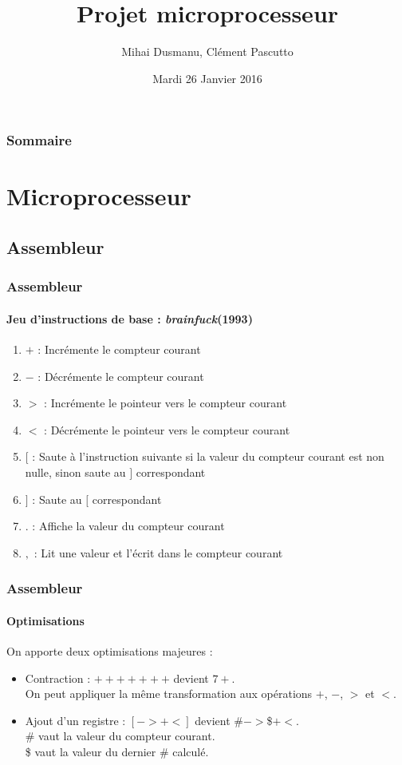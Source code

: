 \documentclass{beamer}
\title{Projet microprocesseur}
\author{Mihai Dusmanu, Clément Pascutto}
\institute{Système digital\\École normale supérieure}
\date{Mardi 26 Janvier 2016}
\begin{document}
	\begin{frame}
		\maketitle
	\end{frame}

	\begin{frame}
		\frametitle{Sommaire}
		\tableofcontents
	\end{frame}

	\section{Microprocesseur}
	\subsection{Assembleur}
	\begin{frame}
		\frametitle{Assembleur}
		\framesubtitle{Jeu d'instructions de base :
			\emph{brainfuck}(1993)}
		\begin{enumerate}
			\item $+$ : Incrémente le compteur courant 
			\pause
			\item $-$ : Décrémente le compteur courant 
			\pause
			\item $>$ : Incrémente le pointeur vers le compteur courant
			\pause
			\item $<$ : Décrémente le pointeur vers le compteur courant
			\pause
			\item $[$ : Saute à l'instruction suivante si la valeur du compteur
				courant est non nulle, sinon saute au $]$ correspondant
			\pause
			\item $]$ : Saute au $[$ correspondant
			\pause
			\item $.$ : Affiche la valeur du compteur courant
			\pause
			\item $,$ : Lit une valeur et l'écrit dans le compteur courant
		\end{enumerate}
	\end{frame}

	\begin{frame}
		\frametitle{Assembleur}
		\framesubtitle{Optimisations}
		On apporte deux optimisations majeures :
		\pause
		\begin{itemize}
			\item Contraction : $+++++++$ devient $7+$.
				\\
				On peut appliquer la même transformation aux opérations $+$, 
				$-$, $>$ et $<$.
			\pause
		\item Ajout d'un registre : $[->+<]$ devient \#$->$\$$+<$. \\
			\# vaut la valeur du compteur courant. \\
			\$ vaut la valeur du dernier \# calculé.
		\end{itemize}
	\end{frame}
\end{document}
